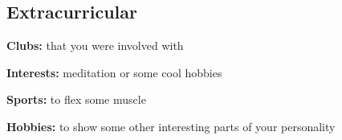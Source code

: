 \documentclass[margin,line]{res}
\newenvironment{list1}{
  \begin{list}{\ding{113}}{%
      \setlength{\itemsep}{0in}
      \setlength{\parsep}{0in} \setlength{\parskip}{0in}
      \setlength{\topsep}{0in} \setlength{\partopsep}{0in} 
      \setlength{\leftmargin}{0in}}}{\end{list}}
\begin{document}
\begin{resume}
\vspace*{-0.1in}

\section{\sc Extracurricular} 
\begin{list1}
\item [] \textbf{Clubs:} that you were involved with

\item [] {\bf Interests:} meditation or some cool hobbies 

\item [] \textbf{Sports:} to flex some muscle 

\item [] \textbf{Hobbies:} to show some other interesting parts of your personality

\end{list1}


\end{resume}
\end{document}

